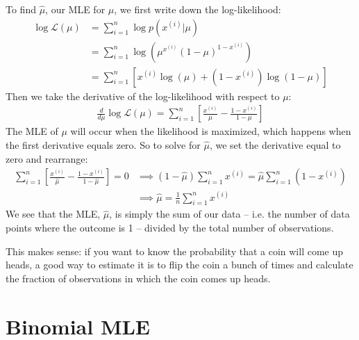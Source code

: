 To find $\hat{\mu}$, our MLE for $\mu$, we first write down the log-likelihood:
\begin{align*}
\log \mathcal{L}(\mu) &= \sum_{i=1}^n \log p(x^{(i)}|\mu) \\
&= \sum_{i=1}^n \log \left( \mu^{x^{(i)}}(1-\mu)^{1-x^{(i)}} \right) \\
&= \sum_{i=1}^n \left[ x^{(i)} \log(\mu) + (1-x^{(i)}) \log(1-\mu) \right] \end{align*}
Then we take the derivative of the log-likelihood with respect to $\mu$:
\begin{align*}
\frac{d}{d \mu} \log \mathcal{L}(\mu) = \sum_{i=1}^n \left[ \frac{x^{(i)}}{\mu} - \frac{1-x^{(i)}}{1-\mu} \right]
\end{align*}
The MLE of $\mu$ will occur when the likelihood is maximized, which happens when the first derivative equals zero. So to solve for $\hat{\mu}$, we set the derivative equal to zero and rearrange:
\begin{align*} \sum_{i=1}^n \left[ \frac{x^{(i)}}{\hat{\mu}} - \frac{1-x^{(i)}}{1-\hat{\mu}} \right] = 0 & \implies (1 - \hat{\mu}) \sum_{i=1}^n x^{(i)} = \hat{\mu} \sum_{i=1}^n (1 - x^{(i)}) \\
& \implies \boxed{\hat{\mu} = \frac{1}{n} \sum_{i=1}^n x^{(i)}} \end{align*}
We see that the MLE, $\hat{\mu}$, is simply the sum of our data -- i.e. the number of data points where the outcome is 1 -- divided by the total number of observations. 

This makes sense: if you want to know the probability that a coin will come up heads, a good way to estimate it is to flip the coin a bunch of times and calculate the fraction of observations in which the coin comes up heads. 

\section{Binomial MLE}

